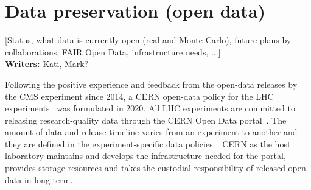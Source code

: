 \documentclass[11pt]{article}
\begin{document}
\section{Data preservation (open data)}

[Status, what data is currently open (real and Monte Carlo), future plans by collaborations, FAIR Open Data, infrastructure needs, ...]\\

\noindent\textbf{Writers:} Kati, Mark?



Following the positive experience and feedback from the open-data releases by the CMS experiment since 2014, a CERN open-data policy for the LHC experiments~\cite{cern-data-policy} was formulated in 2020. All LHC experiments are committed to releasing research-quality data through the CERN Open Data portal~\cite{CODP}. The amount of data and release timeline varies from an experiment to another and they are defined in the experiment-specific data policies~\cite{cern-data-policy,cern-open-data-privacy-policy,cms-open-data-policy,atlas-open-data-policy,lhcb-open-data-policy,alice-open-data-policy}. CERN as the host laboratory maintains and develops the infrastructure needed for the portal, provides storage resources and takes the custodial responsibility of released open data in long term. 
\end{document}
